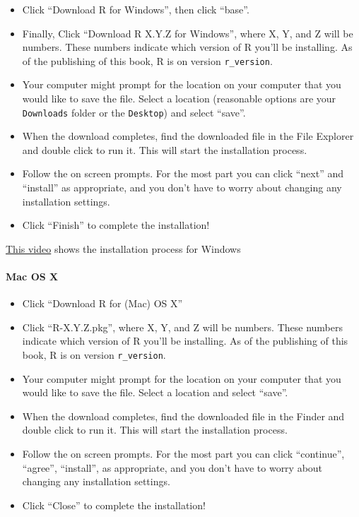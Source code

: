 \documentclass[
]{article}
\providecommand{\tightlist}{%
  \setlength{\itemsep}{0pt}\setlength{\parskip}{0pt}}
\newenvironment{video}{
  \specialblock{video}{vidicon-fill.png}{Video}
}{\endspecialblock}
\begin{document}
\begin{itemize}
\tightlist
\item
  Click ``Download R for Windows'', then click ``base''.
\item
  Finally, Click ``Download R X.Y.Z for Windows'', where X, Y, and Z will be numbers. These numbers indicate which version of R you'll be installing. As of the publishing of this book, R is on version \texttt{r\_version}.
\item
  Your computer might prompt for the location on your computer that you would like to save the file. Select a location (reasonable options are your \texttt{Downloads} folder or the \texttt{Desktop}) and select ``save''.
\item
  When the download completes, find the downloaded file in the File Explorer and double click to run it. This will start the installation process.
\item
  Follow the on screen prompts. For the most part you can click ``next'' and ``install'' as appropriate, and you don't have to worry about changing any installation settings.
\item
  Click ``Finish'' to complete the installation!
\end{itemize}

\begin{video}
\href{https://youtu.be/7ZYn6q_pboE}{This video} shows the installation
process for Windows
\end{video}

\hypertarget{mac-os-x}{%
\paragraph{Mac OS X}\label{mac-os-x}}

\begin{itemize}
\tightlist
\item
  Click ``Download R for (Mac) OS X''
\item
  Click ``R-X.Y.Z.pkg'', where X, Y, and Z will be numbers. These numbers indicate which version of R you'll be installing. As of the publishing of this book, R is on version \texttt{r\_version}.
\item
  Your computer might prompt for the location on your computer that you would like to save the file. Select a location and select ``save''.
\item
  When the download completes, find the downloaded file in the Finder and double click to run it. This will start the installation process.
\item
  Follow the on screen prompts. For the most part you can click ``continue'', ``agree'', ``install'', as appropriate, and you don't have to worry about changing any installation settings.
\item
  Click ``Close'' to complete the installation!
\end{itemize}
\end{document}
